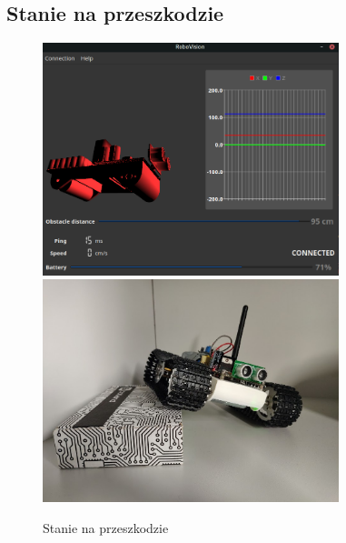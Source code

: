 \documentclass[12pt,a4paper,polish]{article}
\begin{document}
  \subsection{Stanie na przeszkodzie}
  \begin{figure}[h]
    \centering
    \includegraphics[width=0.77\textwidth]{img/final/2.png}
    \includegraphics[width=0.77\textwidth]{img/final/2e.jpg}
    \caption{Stanie na przeszkodzie}
  \end{figure}
\end{document}
